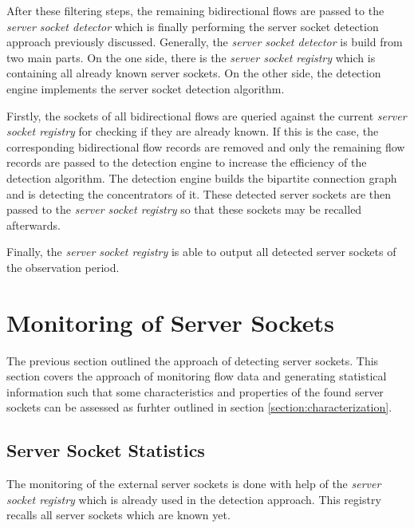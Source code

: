 After these filtering steps, the remaining bidirectional flows are passed to the 
\emph{server socket detector} which is finally performing the \gls{server socket} detection 
approach previously discussed. Generally, the \emph{server socket detector} is build 
from two main parts. 
On the one side, there is the \emph{server socket registry} which is 
containing all already known \glspl{server socket}. On the other side, the detection 
engine implements the \gls{server socket} detection algorithm. 

Firstly, the sockets of all bidirectional flows are queried against the current 
\emph{server socket registry} for checking if they are already known. If this is 
the case, the corresponding bidirectional flow records are removed and only the 
remaining flow records are passed to the detection engine to increase the 
efficiency of the detection algorithm. 
The detection engine builds the bipartite connection 
graph and is detecting the concentrators of it. These detected \glspl{server 
socket} are then passed to the \emph{server socket registry} so that these 
sockets may be recalled afterwards. 

Finally, the \emph{server socket registry} is able to output all detected 
\glspl{server socket} of the observation period. 

\newpage
\section{Monitoring of Server Sockets 
\label{section:socket_tracking}}

The previous section outlined the approach of detecting \glspl{server socket}. 
This section covers the approach of monitoring flow data and generating 
statistical information such that some characteristics and properties of the 
found \glspl{server socket} can be assessed as furhter outlined in section 
\ref{section:characterization}.

\subsection{Server Socket Statistics}

The monitoring of the external 
\glspl{server socket} is done with help of the \emph{server socket registry} 
which is already used in the detection approach. This registry recalls all 
\glspl{server socket} which are known yet. 


